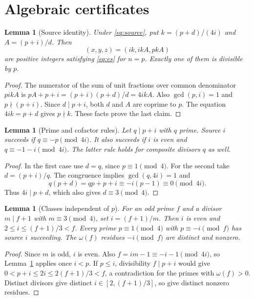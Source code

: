 \documentclass[11pt,a4paper]{amsart}
\newtheorem{lemma}[theorem]{Lemma}
\theoremstyle{definition}\newtheorem{definition}[theorem]{Definition}
\begin{document}
\section{Algebraic certificates}
\begin{lemma}[Source identity]\label{lem:identity}
Under \eqref{eq:source}, put $k=(p+d)/(4i)$ and $A=(p+i)/d$. Then
\begin{equation}\label{eq:triple}
 (x,y,z)=(ik,ikA,pkA)
\end{equation}
are positive integers satisfying \eqref{eq:es} for $n=p$.
Exactly one of them is divisible by $p$.
\end{lemma}
\begin{proof}
The numerator of the sum of unit fractions over common denominator
$pikA$ is
$pA+p+i=(p+i)(p+d)/d=4ikA$.
Also $\gcd(p,i)=1$ and $p\nmid(p+i)$.
Since $d\mid p+i$, both $d$ and $A$ are coprime to $p$.
The equation $4ik=p+d$ gives $p\nmid k$. These facts prove the last claim.
\end{proof}

\begin{lemma}[Prime and cofactor rules]\label{lem:rules}
Let $q\mid p+i$ with $q$ prime. Source $i$ succeeds if
$q\equiv-p\pmod{4i}$. It also succeeds if $i$ is even and
$q\equiv-1-i\pmod{4i}$.
The latter rule holds for composite divisors $q$ as well.
\end{lemma}
\begin{proof}
In the first case use $d=q$, since $p\equiv1\pmod4$.
For the second take $d=(p+i)/q$.
The congruence implies $\gcd(q,4i)=1$ and
\[
 q(p+d)=qp+p+i\equiv-i(p-1)\equiv0\pmod{4i}.
\]
Thus $4i\mid p+d$, which also gives $d\equiv3\pmod4$.
\end{proof}

\begin{lemma}[Classes independent of $p$]\label{lem:classes}
For an odd prime $f$ and a divisor $m\mid f+1$ with $m\equiv3\pmod4$,
set $i=(f+1)/m$. Then $i$ is even and
$2\le i\le(f+1)/3<f$. Every prime $p\equiv1\pmod4$
with $p\equiv-i\pmod f$ has source $i$ succeeding.
The $\omega(f)$ residues $-i\pmod f$ are distinct and nonzero.
\end{lemma}
\begin{proof}
Since $m$ is odd, $i$ is even. Also
$f=im-1\equiv-i-1\pmod{4i}$, so Lemma~\ref{lem:rules} applies
once $i<p$. If $p\le i$, divisibility $f\mid p+i$ would give
$0<p+i\le2i\le2(f+1)/3<f$, a contradiction for the primes
with $\omega(f)>0$. Distinct divisors give distinct
$i\in[2,(f+1)/3]$, so give distinct nonzero residues.
\end{proof}
\end{document}
